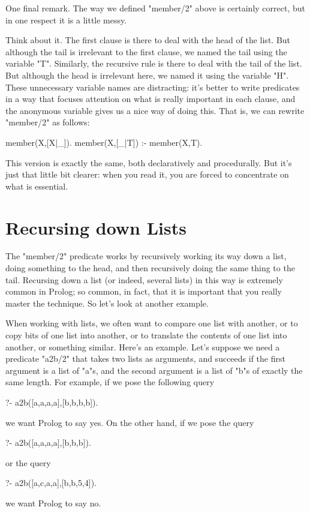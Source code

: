 One final remark.  The way we defined "member/2" above is
certainly correct, but in one respect it is a little messy.

Think about it. The first clause is there to deal with the head of the
list. But although the tail is irrelevant to the first clause, we
named the tail using the variable "T". Similarly,
the recursive rule is there to deal with the tail of the list.  But
although the head is irrelevant here, we named it
using the variable  "H". These unnecessary variable
names are distracting: it's better to write predicates in a way that
focuses attention on what is really important in each clause, and the
anonymous variable gives us a nice way of doing this. That is, we  can rewrite
"member/2" as follows:
\begin{LPNcodedisplay}
member(X,[X|_]).
member(X,[_|T]) :- member(X,T).
\end{LPNcodedisplay}

This version is exactly the same, both declaratively and procedurally.
But it's just that little bit clearer: when you read it, you are
forced to concentrate on what is essential.


\section{Recursing down Lists}\label{SEC.L4.RDAL}

The "member/2" predicate works by recursively working its way down a
list, doing something to the head, and then recursively doing the same
thing to the tail. Recursing down a list (or indeed, several lists) in
this way is extremely common in Prolog; so common, in fact, that it is
important that you really master the technique. So let's look at another
example.

When working with lists, we often want to compare one list
with another, or to copy bits of one list into another, or to
translate the contents of one list into another, or something similar.
Here's an example. Let's suppose we need a predicate
"a2b/2" that takes two lists as arguments, and succeeds if
the first argument is a list of "a"s, and the second argument is
a list of "b"s of exactly the same length.  For example, if we
pose the following query
\begin{LPNcodedisplay}
?- a2b([a,a,a,a],[b,b,b,b]).
\end{LPNcodedisplay}
we want Prolog to say yes. On the other hand, if we pose the query
\begin{LPNcodedisplay}
?- a2b([a,a,a,a],[b,b,b]).
\end{LPNcodedisplay}
or the query
\begin{LPNcodedisplay}
?- a2b([a,c,a,a],[b,b,5,4]).
\end{LPNcodedisplay}
we want Prolog to say no.

